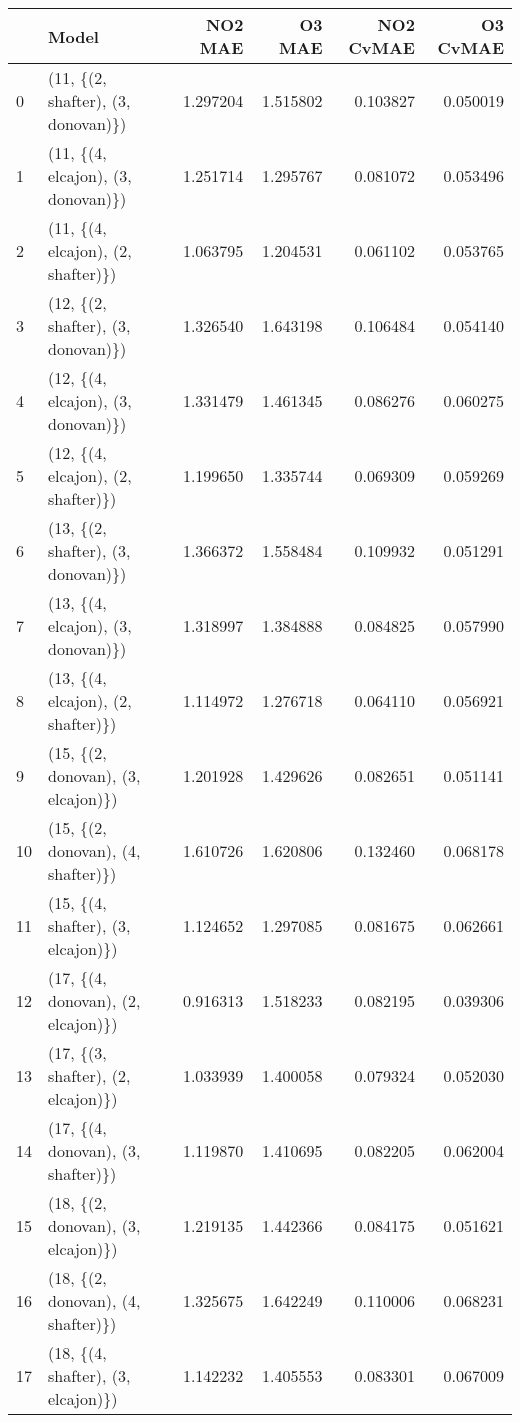 \begin{tabular}{llrrrr}
\toprule
{} &                               Model &   NO2 MAE &    O3 MAE &  NO2 CvMAE &  O3 CvMAE \\
\midrule
0  &  (11, \{(2, shafter), (3, donovan)\}) &  1.297204 &  1.515802 &   0.103827 &  0.050019 \\
1  &  (11, \{(4, elcajon), (3, donovan)\}) &  1.251714 &  1.295767 &   0.081072 &  0.053496 \\
2  &  (11, \{(4, elcajon), (2, shafter)\}) &  1.063795 &  1.204531 &   0.061102 &  0.053765 \\
3  &  (12, \{(2, shafter), (3, donovan)\}) &  1.326540 &  1.643198 &   0.106484 &  0.054140 \\
4  &  (12, \{(4, elcajon), (3, donovan)\}) &  1.331479 &  1.461345 &   0.086276 &  0.060275 \\
5  &  (12, \{(4, elcajon), (2, shafter)\}) &  1.199650 &  1.335744 &   0.069309 &  0.059269 \\
6  &  (13, \{(2, shafter), (3, donovan)\}) &  1.366372 &  1.558484 &   0.109932 &  0.051291 \\
7  &  (13, \{(4, elcajon), (3, donovan)\}) &  1.318997 &  1.384888 &   0.084825 &  0.057990 \\
8  &  (13, \{(4, elcajon), (2, shafter)\}) &  1.114972 &  1.276718 &   0.064110 &  0.056921 \\
9  &  (15, \{(2, donovan), (3, elcajon)\}) &  1.201928 &  1.429626 &   0.082651 &  0.051141 \\
10 &  (15, \{(2, donovan), (4, shafter)\}) &  1.610726 &  1.620806 &   0.132460 &  0.068178 \\
11 &  (15, \{(4, shafter), (3, elcajon)\}) &  1.124652 &  1.297085 &   0.081675 &  0.062661 \\
12 &  (17, \{(4, donovan), (2, elcajon)\}) &  0.916313 &  1.518233 &   0.082195 &  0.039306 \\
13 &  (17, \{(3, shafter), (2, elcajon)\}) &  1.033939 &  1.400058 &   0.079324 &  0.052030 \\
14 &  (17, \{(4, donovan), (3, shafter)\}) &  1.119870 &  1.410695 &   0.082205 &  0.062004 \\
15 &  (18, \{(2, donovan), (3, elcajon)\}) &  1.219135 &  1.442366 &   0.084175 &  0.051621 \\
16 &  (18, \{(2, donovan), (4, shafter)\}) &  1.325675 &  1.642249 &   0.110006 &  0.068231 \\
17 &  (18, \{(4, shafter), (3, elcajon)\}) &  1.142232 &  1.405553 &   0.083301 &  0.067009 \\

\end{tabular}
